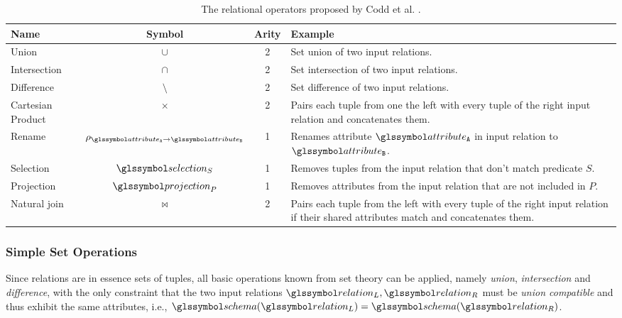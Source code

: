 \begin{table}
    \caption{The relational operators proposed by Codd et al. \cite{Codd:1970Relational,Garcia:2009Database}.}
    \label{table:relational_operators}
    \begin{tabular}{| l | c | c | p{75mm} |}
        \hline
       \textbf{Name} & \textbf{Symbol} & \textbf{Arity}  & \textbf{Example} \\ 
        \hline
        \hline
        Union & $\cup$  & 2 & Set union of two input relations. \\
        \hline
        Intersection & $\cap$  & 2 & Set intersection of two input relations. \\
        \hline
        Difference & $\setminus$  & 2 & Set difference of two input relations. \\
        \hline
        Cartesian Product & $\times$ & 2 & Pairs each tuple from one the left with every tuple of the right input relation and concatenates them. \\
        \hline
        Rename & $\rho_{\attribute_\mathtt{A} \rightarrow \attribute_\mathtt{B}}$ &  1 & Renames attribute $\attribute_\mathtt{A}$ in input relation to $\attribute_\mathtt{B}$. \\
        \hline
        Selection & $\selection_{S}$ &  1 & Removes tuples from the input relation that don't match predicate $S$. \\
        \hline
        Projection & $\projection_{P}$ &  1 & Removes attributes from the input relation that are not included in $P$. \\
        \hline
        Natural join & $\Join$ & 2 & Pairs each tuple from the left with every tuple of the right input relation if their shared attributes match and concatenates them. \\
        \hline
    \end{tabular}
\end{table}

\subsubsection{Simple Set Operations}

Since relations are in essence sets of tuples, all basic operations known from set theory can be applied, namely \emph{union}, \emph{intersection} and \emph{difference}, with the only constraint that the two input relations $\relation_L,\relation_R$ must be \emph{union compatible} and thus exhibit the same attributes, i.e., $\schema(\relation_L) = \schema(\relation_R)$.

